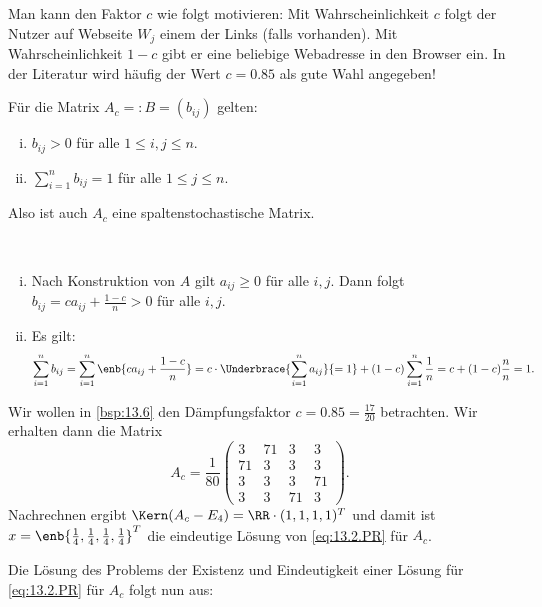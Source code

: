 Man kann den Faktor $c$ wie folgt motivieren:
Mit Wahrscheinlichkeit $c$ folgt der Nutzer auf Webseite $W_j$ einem der Links (falls vorhanden).
Mit Wahrscheinlichkeit $1-c$ gibt er eine beliebige Webadresse in den Browser ein.
In der Literatur wird häufig der Wert $c = 0.85$ als gute Wahl angegeben!

\begin{lemma}
	\label{lemma:13.8}
	Für die Matrix $A_c =: B = (b_{ij})$ gelten:
	\begin{enumerate}[(i)]
		\item $b_{ij} > 0$ für alle $1 \leq i,j \leq n$.
		\item $\sum_{i=1}^{n} b_{ij} = 1$ für alle $1 \leq j \leq n$.
	\end{enumerate}
	Also ist auch $A_c$ eine spaltenstochastische Matrix.
\end{lemma}

\begin{beweis}
	\mbox{} \\[-.9cm]
	\begin{enumerate}[(i)]
		\item Nach Konstruktion von $A$ gilt $a_{ij} \geq 0$ für alle $i,j$.
		Dann folgt $b_{ij} = ca_{ij} + \frac{1-c}{n} > 0$ für alle $i,j$.
		\item Es gilt: 
		\[
			\sum_{i=1}^{n} b_{ij} = \sum_{i=1}^{n} \enb{ca_{ij} + \frac{1-c}{n}} = c \cdot \Underbrace{\sum_{i=1}^{n} a_{ij}}{=1} + (1-c) \sum_{i=1}^{n} \frac{1}{n} = c+(1-c) \frac{n}{n} = 1. 
		\]
	\end{enumerate}
	
\end{beweis}

\begin{beispiel}
	\label{bsp:13.9}
	Wir wollen in \autoref{bsp:13.6} den Dämpfungsfaktor $c = 0.85 = \frac{17}{20}$ betrachten.
	Wir erhalten dann die Matrix
	\[
		A_c = \frac{1}{80} \begin{pmatrix}
			3  & 71 & 3  & 3  \\
			71 & 3  & 3  & 3  \\
			3  & 3  & 3  & 71 \\
			3  & 3  & 71 & 3
		\end{pmatrix}. 
	\]
	Nachrechnen ergibt $\Kern(A_c - E_4) = \RR \cdot (1,1,1,1)^T$ und damit ist $x = \enb{\frac{1}{4},\frac{1}{4},\frac{1}{4},\frac{1}{4}}^T$ die eindeutige Lösung von \eqref{eq:13.2.PR} für $A_c$.
\end{beispiel}

Die Lösung des Problems der Existenz und Eindeutigkeit einer Lösung für \eqref{eq:13.2.PR} für $A_c$ folgt nun aus:

